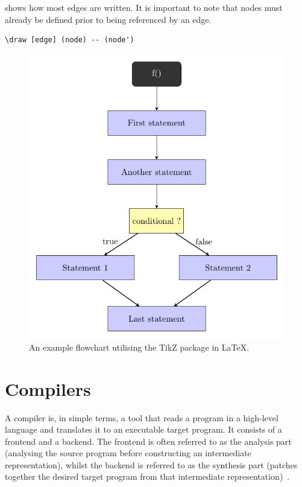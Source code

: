  shows how most edges are written. It is important to note that nodes must already be defined prior to being referenced by an edge. \\

\begin{lstlisting}[caption={How edges are written with TikZ.}, captionpos=b, label={How edges are written with TikZ.}]
\draw [edge] (node) -- (node')
\end{lstlisting}

\begin{figure}[ht]
    \centering
    \includegraphics[scale=.9]{assets/chapter2/TheFirstFlowchart.pdf}
    \caption{An example flowchart utilising the TikZ package in LaTeX.}
    \label{The first Flowchart program.}
\end{figure}

\section{Compilers}

A compiler is, in simple terms, a tool that reads a program in a high-level language and translates it to an executable target program. It consists of a frontend and a backend. The frontend is often referred to as the analysis part (analysing the source program before constructing an intermediate representation), whilst the backend is referred to as the synthesis part (patches together the desired target program from that intermediate representation)~\cite{whatIsACompiler}. \\

